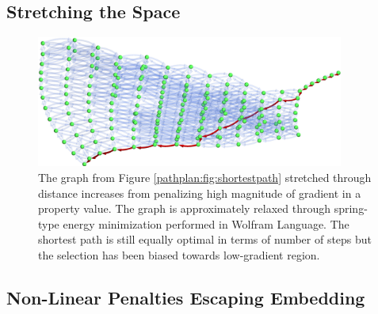 \todo

\citet{Tandoc2023MiningAlloys}

\subsection{Stretching the Space} \label{pathplan:ssec:gradientstretch}

\todo

\begin{figure}[H]
    \centering
    \includegraphics[width=0.9\textwidth]{pathplanning/InfeasibilityGliding_LowGradient.png}
    \caption{The graph from Figure \ref{pathplan:fig:shortestpath} stretched through distance increases from penalizing high magnitude of gradient in a property value. The graph is approximately relaxed through spring-type energy minimization performed in Wolfram Language. The shortest path is still equally optimal in terms of number of steps but the selection has been biased towards low-gradient region.}
    \label{pathplan:fig:lowgradient}
\end{figure}

\subsection{Non-Linear Penalties Escaping Embedding} \label{pathplan:ssec:gradientsquare}

\todo

